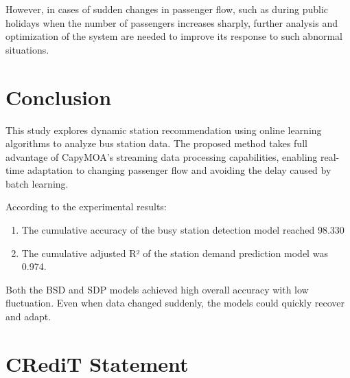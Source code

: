 \documentclass[11pt]{article} %
\begin{document}
However, in cases of sudden changes in passenger flow, such as during public holidays when the number of passengers increases sharply, further analysis and optimization of the system are needed to improve its response to such abnormal situations.

\section{Conclusion}

This study explores dynamic station recommendation using online learning algorithms to analyze bus station data. The proposed method takes full advantage of CapyMOA's streaming data processing capabilities, enabling real-time adaptation to changing passenger flow and avoiding the delay caused by batch learning.

According to the experimental results:

\begin{enumerate}
	\item The cumulative accuracy of the busy station detection model reached 98.330%
	\item The cumulative adjusted R² of the station demand prediction model was 0.974.
\end{enumerate}
	
Both the BSD and SDP models achieved high overall accuracy with low fluctuation. Even when data changed suddenly, the models could quickly recover and adapt.

\section{CRediT Statement}


  
 
	
\end{document}
